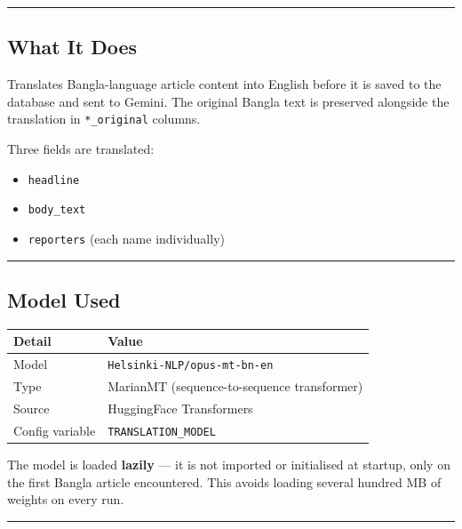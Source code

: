 \documentclass[
]{article}
\newcounter{none} %
\providecommand{\tightlist}{%
  \setlength{\itemsep}{0pt}\setlength{\parskip}{0pt}}
\begin{document}
\begin{center}\rule{0.5\linewidth}{0.5pt}\end{center}

\subsection{What It Does}\label{what-it-does-2}

Translates Bangla-language article content into English before it is
saved to the database and sent to Gemini. The original Bangla text is
preserved alongside the translation in \texttt{*\_original} columns.

Three fields are translated:

\begin{itemize}
\tightlist
\item
  \texttt{headline}
\item
  \texttt{body\_text}
\item
  \texttt{reporters} (each name individually)
\end{itemize}

\begin{center}\rule{0.5\linewidth}{0.5pt}\end{center}

\subsection{Model Used}\label{model-used}

{\def\LTcaptype{none} %
\begin{longtable}[]{@{}ll@{}}
\toprule\noalign{}
Detail & Value \\
\midrule\noalign{}
\endhead
\bottomrule\noalign{}
\endlastfoot
Model & \texttt{Helsinki-NLP/opus-mt-bn-en} \\
Type & MarianMT (sequence-to-sequence transformer) \\
Source & HuggingFace Transformers \\
Config variable & \texttt{TRANSLATION\_MODEL} \\
\end{longtable}
}

The model is loaded \textbf{lazily} --- it is not imported or
initialised at startup, only on the first Bangla article encountered.
This avoids loading several hundred MB of weights on every run.

\begin{center}\rule{0.5\linewidth}{0.5pt}\end{center}
\end{document}
